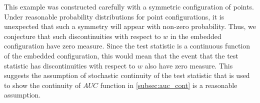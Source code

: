 \documentclass[12pt,oneside,final]{thesis}\usepackage[]{graphicx}\usepackage[]{color}
\makeatletter
\newenvironment{kframe}{%
 \def\at@end@of@kframe{}%
 \ifinner\ifhmode%
  \def\at@end@of@kframe{\end{minipage}}%
  \begin{minipage}{\columnwidth}%
 \fi\fi%
 \def\FrameCommand##1{\hskip\@totalleftmargin \hskip-\fboxsep
 \colorbox{shadecolor}{##1}\hskip-\fboxsep
     \hskip-\linewidth \hskip-\@totalleftmargin \hskip\columnwidth}%
 \MakeFramed {\advance\hsize-\width
   \@totalleftmargin\z@ \linewidth\hsize
   \@setminipage}}%
 {\par\unskip\endMakeFramed%
 \at@end@of@kframe}
\newenvironment{knitrout}{}{} %
\makeatother
\begin{document}

\begin{knitrout}
\color{fgcolor}\begin{kframe}


{\ttfamily\noindent\bfseries{}}

{\ttfamily\noindent\bfseries\color{errorcolor}{\#\# Error: object 'g2' not found}}\end{kframe}
\end{knitrout}



This example was constructed carefully with a symmetric configuration of points. Under reasonable probability distributions for point configurations, it is unexpected that such a symmetry will appear with non-zero probability. Thus, we conjecture that such discontinuities with respect to $w$ in the embedded configuration  have zero measure. Since the test statistic is a continuous function of the embedded configuration, this would mean that the event that the test statistic has discontinuities with respect to $w$ also have zero measure. This suggests the assumption of stochastic continuity of the test statistic  that is used to show the continuity of $AUC$ function in \autoref{subsec:auc_cont} is a reasonable assumption.

\end{document}
